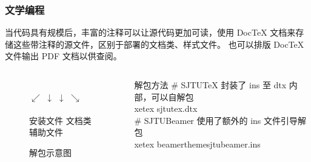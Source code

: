 \begin{frame}[fragile]
  \frametitle{文学编程}


  当代码具有规模后，丰富的注释可以让源代码更加可读，使用 Doc\TeX{} 文档来存储这些带注释的源文件，区别于部署的文档类、样式文件。
  也可以排版 Doc\TeX{} 文件输出 PDF 文档以供查阅。

  \begin{columns}
    \begin{column}{.4\textwidth}
      \begin{figure}
        \centering
        \\
        $\swarrow$ \quad $\downarrow$ \quad $\downarrow$ \quad $\searrow$\\
            \\[0.5ex]
        {\small 安装文件 文档类 \quad 辅助文件 \hspace*{2em}}
        \caption{\SJTUTeX{} 解包示意图}
      \end{figure}
    \end{column}
    \begin{column}{.5\textwidth}
      \begin{exampleblock}{\faTerminal 解包方法}
        \ttfamily
        {\color{gray} \# SJTUTeX 封装了 ins 至 dtx 内部，可以自解包} \\
        xetex sjtutex.dtx \\
        {\color{gray} \# SJTUBeamer 使用了额外的 ins 文件引导解包}\\
        xetex beamerthemesjtubeamer.ins \\
      \end{exampleblock}
      
    \end{column}
  \end{columns}



\end{frame}

